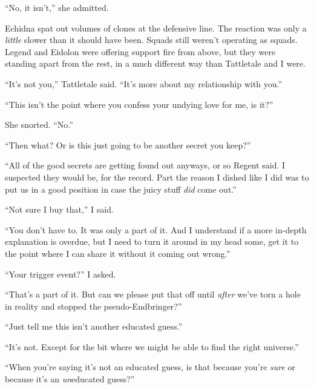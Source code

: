 ``No, it isn't,'' she admitted.



Echidna spat out volumes of clones at the defensive line.  The reaction was only a \emph{little }slower than it should have been.  Squads still weren't operating as squads.  Legend and Eidolon were offering support fire from above, but they were standing apart from the rest, in a much different way than Tattletale and I were.



``It's not you,'' Tattletale said.  ``It's more about my relationship with you.''



``This isn't the point where you confess your undying love for me, is it?''



She snorted.  ``No.''



``Then what?  Or is this just going to be another secret you keep?''



``All of the good secrets are getting found out anyways, or so Regent said.  I suspected they would be, for the record.  Part the reason I dished like I did was to put us in a good position in case the juicy stuff \emph{did} come out.''



``Not sure I buy that,'' I said.



``You don't have to.  It was only a part of it.  And I understand if a more in-depth explanation is overdue, but I need to turn it around in my head some, get it to the point where I can share it without it coming out wrong.''



``Your trigger event?'' I asked.



``That's a part of it.  But can we please put that off until \emph{after} we've torn a hole in reality and stopped the pseudo-Endbringer?''



``Just tell me this isn't another educated guess.''



``It's not.  Except for the bit where we might be able to find the right universe.''



``When you're saying it's not an educated guess, is that because you're \emph{sure} or because it's an \emph{un}educated guess?''



